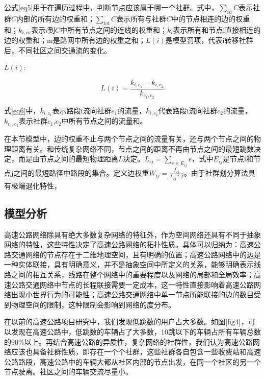 			公式\ref{eq5}用于在遍历过程中，判断节点应该属于哪一个社群。式中，$\sum_{in} C$表示社群$C$内部的所有边的权重和；$\sum_{tot} C$表示所有与社群$C$中的节点相连的边的权重和；$k_{i,in}$表示$i$到$C$中所有节点之间的连线的权重和；$k_i$表示所有和节点i直接相连的边的权重和；m是路网中所有边的权重之和；$L(i)$是模型罚项，代表i转移社群后，不同社区之间交通流的变化。

			$L(i)$:

			\begin{equation}
			L(i)=\frac{{{k_{i,{c_1}}} - {k_{i,{c_2}}}}}{{{k_{{c_1},{c_2}}}}}
			\label{eq6}
			\end{equation}

			式\ref{eq6}中，${k_{i,{c_1}}}$表示路段i流向社群$c_1$的流量，$k_{i,{c_2}}$代表路段i流向社群$c_2$的流量，${{{k_{{c_1},{c_2}}}}}$表示社群$c_1$,$c_2$中所有节点之间的流量和。

			在本节模型中，边的权重不止与两个节点之间的流量有关，还与两个节点之间的物理距离有关。和传统复杂网络不同，节点之间的距离不再由节点之间的最短跳数决定，而是由节点之间的最短物理距离$L$决定。$L_{ij}=\sum\limits_{e \in E_{ij}} {e}$，式中$E_{ij}$是节点i和节点j之间的最短路径中路段的集合。定义边权重$W_{ij}=\frac{f_{ij}}{L_{ij}*T}$。由于社群划分算法具有极端退化特性，



		\subsection{模型分析}
			高速公路网络除具有绝大多数复杂网络的特征外，作为空间网络还具有不同于抽象网络的特性，这些特性决定了高速公路网络的拓扑性质。具体可以归纳为：高速公路交通网络的节点存在于二维地理空间，且有明确的位置；高速公路网络中的边是一种实体联接，具有明确意义，并不是抽象空间中所定义的关系，能够明确表示线路之间的相互关系，线路在整个网络中的重要程度以及网络的局部和全局效率；高速公路交通网络中节点的长程联接需要一定成本，这一特性直接影响着高速公路网络出现小世界行为的可能性；高速公路交通网络中单一节点所能联接的边的数目受到物理空间的限制，这种限制会影响到网络的度分布。

			在以前的高速公路项目研究中，我们发现低跳数的用户占大多数。如图$\ref{fig4}$，可以发现在高速公路中，低跳数的车辆占了大多数，10跳以下的车辆占所有车辆总数的90\%以上。再结合高速公路的异质性，复杂网络的社群性，我们认为高速公路网络应该也具备社群性质，即存在一个个社群，这些社群各自包含一些收费站和高速公路路段，高速公路中的车辆大都从社区内部的节点出发，在同一个社区的另一个节点驶离。社区之间的车辆交流尽量小。

